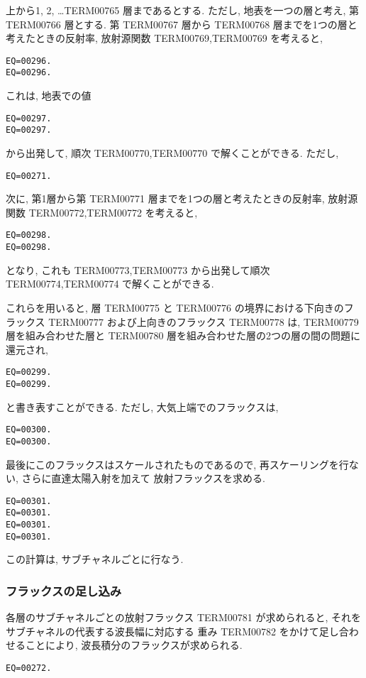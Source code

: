 上から1, 2, \ldots TERM00765 層まであるとする. 
ただし, 地表を一つの層と考え, 第 TERM00766 層とする.
第 TERM00767 層から TERM00768 層までを1つの層と考えたときの反射率, 放射源関数
TERM00769,TERM00769 を考えると,
\begin{verbatim}
EQ=00296.
EQ=00296.
\end{verbatim}
これは, 地表での値
\begin{verbatim}
EQ=00297.
EQ=00297.
\end{verbatim}
から出発して, 順次 TERM00770,TERM00770 で解くことができる.
ただし,
\begin{verbatim}
EQ=00271.
\end{verbatim}


次に, 第1層から第 TERM00771 層までを1つの層と考えたときの反射率, 放射源関数
TERM00772,TERM00772 を考えると,
\begin{verbatim}
EQ=00298.
EQ=00298.
\end{verbatim}
となり, これも TERM00773,TERM00773
から出発して順次 TERM00774,TERM00774 で解くことができる.

これらを用いると,
層 TERM00775 と TERM00776 の境界における下向きのフラックス TERM00777
および上向きのフラックス TERM00778 は,
TERM00779 層を組み合わせた層と
TERM00780 層を組み合わせた層の2つの層の間の問題に還元され,
\begin{verbatim}
EQ=00299.
EQ=00299.
\end{verbatim}
と書き表すことができる.
ただし, 大気上端でのフラックスは,
\begin{verbatim}
EQ=00300.
EQ=00300.
\end{verbatim}

最後にこのフラックスはスケールされたものであるので,
再スケーリングを行ない, さらに直達太陽入射を加えて
放射フラックスを求める.

\begin{verbatim}
EQ=00301.
EQ=00301.
EQ=00301.
EQ=00301.
\end{verbatim}

この計算は, サブチャネルごとに行なう.

\subsubsection{フラックスの足し込み}

各層のサブチャネルごとの放射フラックス TERM00781 が求められると,
それをサブチャネルの代表する波長幅に対応する
重み TERM00782 をかけて足し合わせることにより,
波長積分のフラックスが求められる.

\begin{verbatim}
EQ=00272.
\end{verbatim}

